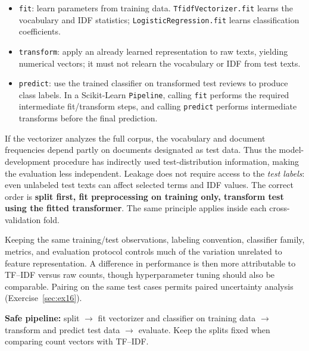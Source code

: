 \begin{itemize}
\item \texttt{fit}: learn parameters from training data. \texttt{TfidfVectorizer.fit} learns the vocabulary and IDF statistics; \texttt{LogisticRegression.fit} learns classification coefficients.
\item \texttt{transform}: apply an already learned representation to raw texts, yielding numerical vectors; it must not relearn the vocabulary or IDF from test texts.
\item \texttt{predict}: use the trained classifier on transformed test reviews to produce class labels. In a Scikit-Learn \texttt{Pipeline}, calling \texttt{fit} performs the required intermediate fit/transform steps, and calling \texttt{predict} performs intermediate transforms before the final prediction.
\end{itemize}

If the vectorizer analyzes the full corpus, the vocabulary and document frequencies depend partly on documents designated as test data. Thus the model-development procedure has indirectly used test-distribution information, making the evaluation less independent. Leakage does not require access to the \emph{test labels}: even unlabeled test texts can affect selected terms and IDF values. The correct order is \textbf{split first, fit preprocessing on training only, transform test using the fitted transformer}. The same principle applies inside each cross-validation fold.

Keeping the same training/test observations, labeling convention, classifier family, metrics, and evaluation protocol controls much of the variation unrelated to feature representation. A difference in performance is then more attributable to TF--IDF versus raw counts, though hyperparameter tuning should also be comparable. Pairing on the same test cases permits paired uncertainty analysis (Exercise~\ref{sec:ex16}).

\begin{answer}
\textbf{Safe pipeline:} split $\to$ fit vectorizer and classifier on training data $\to$ transform and predict test data $\to$ evaluate. Keep the splits fixed when comparing count vectors with TF--IDF.
\end{answer}
